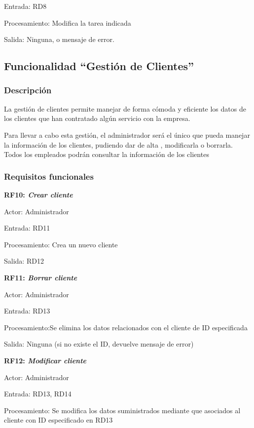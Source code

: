 \documentclass[paper=a4, fontsize=11pt, spanish]{scrartcl}
\begin{document}
Entrada: RD8

Procesamiento: Modifica la tarea indicada

Salida: Ninguna, o mensaje de error.

\subsection{Funcionalidad “Gestión de Clientes”}

\subsubsection{Descripción}
\setlength{\parindent}{3em} La gestión de clientes permite manejar de forma cómoda y eficiente los datos de los clientes que han contratado algún servicio con la empresa.

Para llevar a cabo esta gestión, el administrador será el único que pueda manejar la información de los clientes, pudiendo dar de alta , modificarla o borrarla.
Todos los empleados podrán consultar la información de los clientes

\subsubsection{Requisitos funcionales}
\setlength{\parindent}{0em}
\textbf{RF10: \textit{Crear cliente}}
\setlength{\parindent}{2em}

Actor: Administrador

Entrada: RD11

Procesamiento: Crea un nuevo cliente

Salida: RD12

\setlength{\parindent}{0em}
\textbf{RF11: \textit{Borrar cliente}}
\setlength{\parindent}{2em}

Actor: Administrador

Entrada: RD13

Procesamiento:Se elimina los datos relacionados con el cliente de ID especificada

Salida: Ninguna (si no existe el ID, devuelve mensaje de error)

\setlength{\parindent}{0em}
\textbf{RF12: \textit{Modificar cliente}}
\setlength{\parindent}{2em}

Actor: Administrador

Entrada: RD13, RD14

Procesamiento: Se modifica los datos suministrados mediante que asociados al cliente con ID especificado en RD13
\end{document}
